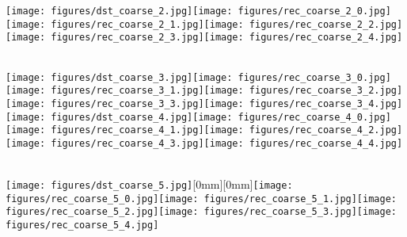 \begin{figure*}[t]
\begin{minipage}[c]{0.972\linewidth}
\texttt{[image: figures/dst\_coarse\_2.jpg]}\hfill \texttt{[image: figures/rec\_coarse\_2\_0.jpg]}\texttt{[image: figures/rec\_coarse\_2\_1.jpg]}\texttt{[image: figures/rec\_coarse\_2\_2.jpg]}\texttt{[image: figures/rec\_coarse\_2\_3.jpg]}\texttt{[image: figures/rec\_coarse\_2\_4.jpg]}\vspace*{-3.5mm}\\
\vspace*{-0.5mm}\\\hspace{0.5mm}\renewcommand{\seed}{seed1733}
\texttt{[image: figures/dst\_coarse\_3.jpg]}\hfill \texttt{[image: figures/rec\_coarse\_3\_0.jpg]}\texttt{[image: figures/rec\_coarse\_3\_1.jpg]}\texttt{[image: figures/rec\_coarse\_3\_2.jpg]}\texttt{[image: figures/rec\_coarse\_3\_3.jpg]}\texttt{[image: figures/rec\_coarse\_3\_4.jpg]}\vv\\
\makebox[\hh][c]{}\hspace{0.5mm}\renewcommand{\seed}{seed1614}
\texttt{[image: figures/dst\_coarse\_4.jpg]}\hfill \texttt{[image: figures/rec\_coarse\_4\_0.jpg]}\texttt{[image: figures/rec\_coarse\_4\_1.jpg]}\texttt{[image: figures/rec\_coarse\_4\_2.jpg]}\texttt{[image: figures/rec\_coarse\_4\_3.jpg]}\texttt{[image: figures/rec\_coarse\_4\_4.jpg]}\vspace*{-3.5mm}\\
\vspace*{-0.5mm}\\\hspace{0.5mm}\renewcommand{\seed}{seed845}
\texttt{[image: figures/dst\_coarse\_5.jpg]}\hfill \raisebox{0mm}[0mm][0mm]{}\texttt{[image: figures/rec\_coarse\_5\_0.jpg]}\texttt{[image: figures/rec\_coarse\_5\_1.jpg]}\texttt{[image: figures/rec\_coarse\_5\_2.jpg]}\texttt{[image: figures/rec\_coarse\_5\_3.jpg]}\texttt{[image: figures/rec\_coarse\_5\_4.jpg]}\\

\end{minipage}
\end{figure*}
